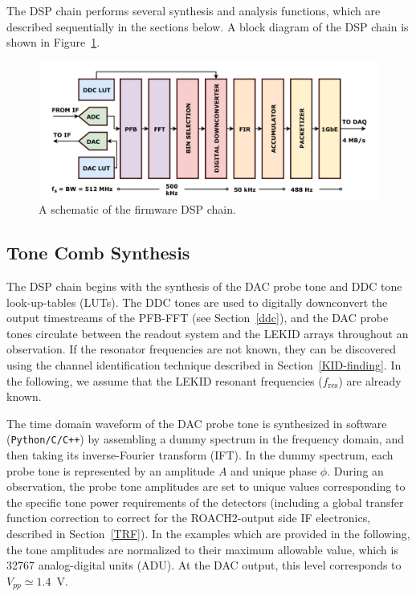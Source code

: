The DSP chain performs several synthesis and analysis functions, which are described sequentially in the sections below. A block diagram of the DSP chain is shown in Figure~\ref{fig:DSP schematic}.

\begin{figure}
\centering
\includegraphics[width=\textwidth]{figures/readout/schematics/readoutDSPdiagram}
\caption{A schematic of the firmware DSP chain.}
\label{fig:DSP schematic}
\end{figure}

\subsection{Tone Comb Synthesis}\label{tone comb}

The DSP chain begins with the synthesis of the DAC probe tone and DDC tone look-up-tables (LUTs). The DDC tones are used to digitally downconvert the output timestreams of the PFB-FFT (see Section~\ref{ddc}), and the DAC probe tones circulate between the readout system and the LEKID arrays throughout an observation. If the resonator frequencies are not known, they can be discovered using the channel identification technique described in Section~\ref{KID-finding}. In the following, we assume that the LEKID resonant frequencies ($f_{\mathrm{res}}$) are already known.

The time domain waveform of the DAC probe tone is synthesized in software (\texttt{Python/C/C++}) by assembling a dummy spectrum in the frequency domain, and then taking its inverse-Fourier transform (IFT). In the dummy spectrum, each probe tone is represented by an amplitude $A$ and unique phase $\phi$. During an observation, the probe tone amplitudes are set to unique values corresponding to the specific tone power requirements of the detectors (including a global transfer function correction to correct for the ROACH2-output side IF electronics, described in Section~\ref{TRF}). In the examples which are provided in the following, the tone amplitudes are normalized to their maximum allowable value, which is 32767 analog-digital units (ADU). At the DAC output, this level corresponds to $V_{pp} \simeq 1.4$~V.

